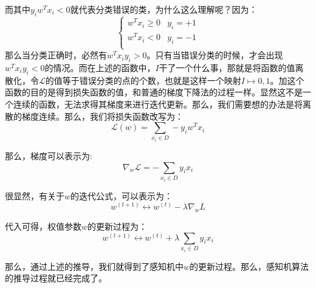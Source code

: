 \documentclass[a4paper]{article}
\begin{document}
而其中$y_iw^Tx_i < 0$就代表分类错误的类，为什么这么理解呢？因为：
\begin{equation}
    \left\{
    \begin{array}{ll}
      w^Tx_i \geq 0 & y_i=+1 \\
      w^Tx_i < 0 & y_i=-1 \\
    \end{array}
    \right.
\end{equation}
那么当分类正确时，必然有$w^Tx_iy_i>0$。只有当错误分类的时候，才会出现$w^Tx_iy_i<0$的情况。而在上述的函数中，$I$干了一个什么事，那就是将函数的值离散化，令$\mathcal{L}$的值等于错误分类的点的个数，也就是这样一个映射$I\mapsto0,1$。加这个函数的目的是得到损失函数的值，和普通的梯度下降法的过程一样。显然这不是一个连续的函数，无法求得其梯度来进行迭代更新。那么，我们需要想的办法是将离散的梯度连续。那么，我们将损失函数改写为：
\begin{equation}
    \mathcal{L}(w)=\sum_{x_i\in D}-y_iw^Tx_i
\end{equation}

那么，梯度可以表示为:
\begin{equation}
    \nabla_{w}\mathcal{L} = -\sum_{x_i\in D}y_ix_i
\end{equation}

很显然，有关于$w$的迭代公式，可以表示为：
\begin{equation}
    w^{(t+1)}\longleftrightarrow w^{(t)}-\lambda \nabla_w L
\end{equation}

代入可得，权值参数$w$的更新过程为：
\begin{equation}
    w^{(t+1)}\longleftrightarrow w^{(t)}+\lambda \sum_{x_i\in D}y_ix_i
\end{equation}

那么，通过上述的推导，我们就得到了感知机中$w$的更新过程。那么，感知机算法的推导过程就已经完成了。
\end{document}
